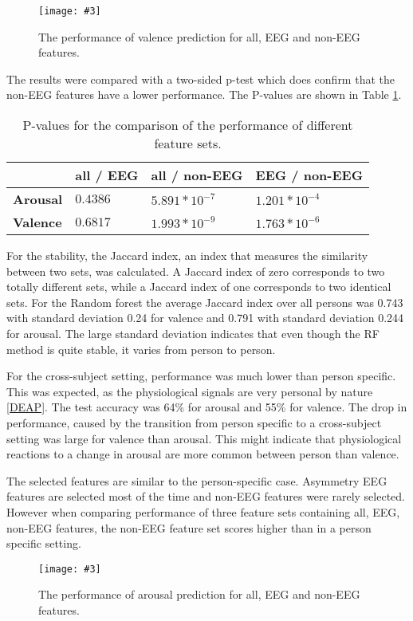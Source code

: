 \documentclass[12pt,journal,compsoc]{IEEEtran}
\newcommand{\npar}{\par \vspace{2.3ex plus 0.3ex minus 0.3ex}}
\newcommand{\mijnfiguur}[4][H]{            %
    \begin{figure}[#1]                      %
        \begin{center}                      %
            \texttt{[image: \#3]}        %
            \caption{#4\label{#3}}          %
        \end{center}
    \end{figure}
    }
\begin{document}
\mijnfiguur{width=.5\textwidth}{valencephyeegall}{The performance of valence prediction for all, EEG and non-EEG features.}

The results were compared with a two-sided p-test which does confirm that the non-EEG features have a lower performance. The P-values are shown in Table \ref{pvals}.
\begin{table}[H]
\centering
\caption{P-values for the comparison of the performance of different feature sets.\label{pvals}}
\begin{tabular}{l|lll}
	    		 & \textbf{all / EEG} & \textbf{all / non-EEG} & \textbf{EEG / non-EEG} \\ \hline
\textbf{Arousal} & $0.4386$          & $5.891 * 10^{-7}$  & $1.201 * 10^{-4}$ \\
\textbf{Valence} & $0.6817$          & $1.993 * 10^{-9}$  & $1.763 * 10^{-6}$                 
\end{tabular}
\end{table}

For the stability, the Jaccard index, an index that measures the similarity between two sets, was calculated. A Jaccard index of zero corresponds to two totally different sets, while a Jaccard index of one corresponds to two identical sets. For the Random forest the average Jaccard index over all persons was 0.743 with standard deviation 0.24 for valence and 0.791 with standard deviation 0.244 for arousal. The large standard deviation indicates that even though the RF method is quite stable, it varies from person to person.

\npar
For the cross-subject setting, performance was much lower than person specific. This was expected, as the physiological signals are very personal by nature \ref{DEAP}. The test accuracy was 64\% for arousal and 55\% for valence. The drop in performance, caused by the transition from person specific to a cross-subject setting was large for valence than arousal. This might indicate that physiological reactions to a change in arousal are more common between person than valence. 

\npar

The selected features are similar to the person-specific case. Asymmetry EEG features are selected most of the time and non-EEG features were rarely selected. However when comparing performance of three feature sets containing all, EEG, non-EEG features, the non-EEG feature set scores higher than in a person specific setting.

\mijnfiguur{width=.5\textwidth}{arousalphyeegall_gen}{The performance of arousal prediction for all, EEG and non-EEG features.}
\end{document}
